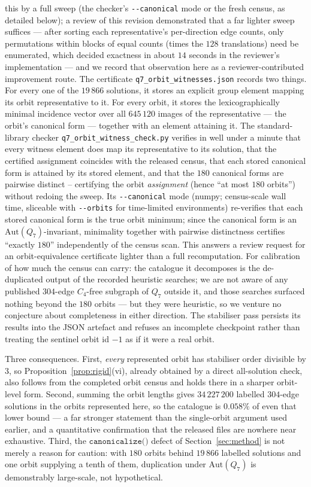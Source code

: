 \documentclass[12pt,a4paper]{article}
\theoremstyle{definition}
\begin{document}
this by a full sweep (the checker's \texttt{-{}-canonical} mode or the
fresh census, as detailed below); a review of this revision demonstrated
that a far lighter sweep suffices --- after sorting each representative's
per-direction edge counts, only permutations within blocks of equal
counts (times the $128$ translations) need be enumerated, which decided
exactness in about $14$ seconds in the reviewer's implementation --- and
we record that observation here as a reviewer-contributed improvement
route. The certificate \texttt{q7\_orbit\_witnesses.json}
records two things. For every one of the $19\,866$ solutions, it stores
an explicit group element mapping its orbit representative to it. For
every orbit, it stores the lexicographically minimal incidence vector
over all $645\,120$ images of the representative --- the orbit's
canonical form --- together with an element attaining it. The standard-library checker
\texttt{q7\_orbit\_witness\_check.py} verifies in well under a minute
that every witness element does map its representative to its solution,
that the certified assignment coincides with the released census, that
each stored canonical form is attained by its stored element, and that the
$180$ canonical forms are pairwise distinct -- certifying the orbit
\emph{assignment} (hence ``at most $180$ orbits'') without redoing the
sweep. Its \texttt{-{}-canonical} mode (numpy; census-scale wall time,
sliceable with \texttt{-{}-orbits} for time-limited environments)
re-verifies that each stored canonical form is the true orbit minimum;
since the canonical form is an $\mathrm{Aut}(Q_7)$-invariant, minimality
together with pairwise distinctness certifies ``exactly $180$''
independently of the census scan. This answers a review request for an
orbit-equivalence certificate lighter than a full recomputation. For
calibration of how much the census can carry: the catalogue it decomposes
is the de-duplicated output of the recorded heuristic searches; we are
not aware of any published $304$-edge $C_4$-free subgraph of $Q_7$
outside it, and those searches surfaced nothing beyond the $180$ orbits
--- but they were heuristic, so we venture no conjecture about
completeness in either direction. The stabiliser pass
persists its results into the JSON artefact and refuses an incomplete
checkpoint rather than treating the sentinel orbit id $-1$ as if it were a
real orbit.

Three consequences. First, \emph{every} represented orbit has stabiliser order
divisible by $3$, so Proposition~\ref{prop:rigid}(vi), already obtained by a
direct all-solution check, also follows from the completed orbit census and
holds there in a sharper orbit-level form. Second, summing the orbit lengths gives $34\,227\,200$ labelled
$304$-edge solutions in the orbits represented here, so the catalogue is
$0.058\%$ of even that lower bound --- a far stronger statement than the
single-orbit argument used earlier, and a quantitative confirmation that the
released files are nowhere near exhaustive. Third, the $\texttt{canonicalize()}$
defect of Section~\ref{sec:method} is not merely a reason for caution: with
$180$ orbits behind $19\,866$ labelled solutions and one orbit supplying a
tenth of them, duplication under $\mathrm{Aut}(Q_7)$ is demonstrably
large-scale, not hypothetical.
\end{document}
